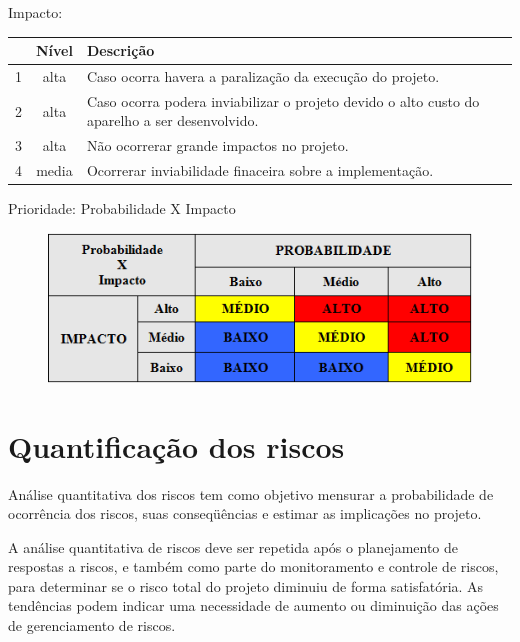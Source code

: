 Impacto:
\begin{table}[h]
\centering
\begin{tabular}{|c|c|p{13.3cm}|}

  & Nível & Descrição\\
\hline                               
1 & alta & Caso ocorra havera a paralização da execução do projeto. \\
\hline
2 & alta & Caso ocorra podera inviabilizar o projeto devido o alto custo do aparelho a ser desenvolvido.\\
\hline
3 & alta & Não ocorrerar grande impactos no projeto.\\
\hline
4 & media & Ocorrerar inviabilidade finaceira sobre a implementação. \\
\hline
\end{tabular}
\end{table}

Prioridade: Probabilidade X Impacto
\begin{figure}[h]
\begin{center}

\includegraphics[scale=0.65]{editaveis/figuras/prioridade}
\label{Prioridade}
\end{center}
\end{figure}
\FloatBarrier

\section*{Quantificação dos riscos}
Análise quantitativa dos riscos tem como objetivo mensurar a probabilidade de ocorrência dos riscos, suas conseqüências e estimar as implicações no projeto.

A análise quantitativa de riscos deve ser repetida após o planejamento de respostas a riscos, e também como parte do monitoramento e controle de riscos, para determinar se o risco total do projeto diminuiu de forma satisfatória. As tendências podem indicar uma necessidade de aumento ou diminuição das ações de gerenciamento de riscos.

